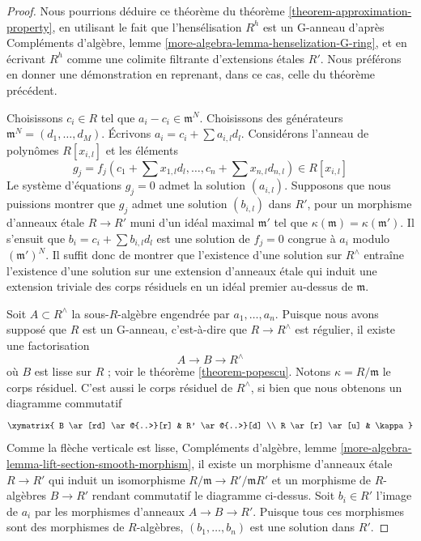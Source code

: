 \begin{proof}
Nous pourrions déduire ce théorème du théorème
\ref{theorem-approximation-property}, en utilisant le fait que
l'hensélisation $R^h$ est un G-anneau d'après
Compléments d'algèbre, lemme
\ref{more-algebra-lemma-henselization-G-ring}, et en écrivant $R^h$ comme une
colimite filtrante d'extensions \'etales $R'$. Nous préférons en donner une
démonstration en reprenant, dans ce cas, celle du théorème précédent.

\medskip\noindent
Choisissons $c_i \in R$ tel que $a_i - c_i \in \mathfrak m^N$.
Choisissons des générateurs $\mathfrak m^N = (d_1, \ldots, d_M)$.
Écrivons $a_i = c_i + \sum a_{i, l} d_l$.
Considérons l'anneau de polynômes $R[x_{i, l}]$ et les éléments
$$
g_j = f_j(c_1 + \sum x_{1, l} d_l , \ldots, c_n + \sum x_{n, l} d_{n, l})
\in R[x_{i, l}]
$$
Le système d'équations $g_j = 0$ admet la solution $(a_{i, l})$.
Supposons que nous puissions montrer que $g_j$ admet une solution
$(b_{i, l})$ dans $R'$, pour un morphisme d'anneaux \'etale $R \to R'$ muni
d'un idéal maximal $\mathfrak m'$ tel que
$\kappa(\mathfrak m) = \kappa(\mathfrak m')$.
Il s'ensuit que $b_i = c_i + \sum b_{i, l}d_l$ est une solution
de $f_j = 0$ congrue à $a_i$ modulo $(\mathfrak m')^N$.
Il suffit donc de montrer que l'existence d'une solution sur $R^\wedge$
entraîne l'existence d'une solution sur une extension d'anneaux \'etale
qui induit une extension triviale des corps résiduels en un idéal premier
au-dessus de $\mathfrak m$.

\medskip\noindent
Soit $A \subset R^\wedge$ la sous-$R$-algèbre engendrée par
$a_1, \ldots, a_n$. Puisque nous avons supposé que $R$ est un G-anneau,
c'est-à-dire que $R \to R^\wedge$ est régulier, il existe une factorisation
$$
A \to B \to R^\wedge
$$
où $B$ est lisse sur $R$ ; voir le théorème \ref{theorem-popescu}.
Notons $\kappa = R/\mathfrak m$ le corps résiduel. C'est aussi
le corps résiduel de $R^\wedge$, si bien que nous obtenons un diagramme
commutatif
$$
\xymatrix{
B \ar[rd] \ar@{..>}[r] & R' \ar@{..>}[d] \\
R \ar[r] \ar[u] & \kappa
}
$$
Comme la flèche verticale est lisse,
Compléments d'algèbre, lemme
\ref{more-algebra-lemma-lift-section-smooth-morphism},
il existe un morphisme d'anneaux \'etale $R \to R'$ qui induit un isomorphisme
$R/\mathfrak m \to R'/\mathfrak mR'$ et un morphisme de $R$-algèbres
$B \to R'$ rendant commutatif le diagramme ci-dessus.
Soit $b_i \in R'$ l'image de $a_i$ par les morphismes d'anneaux
$A \to B \to R'$. Puisque tous ces morphismes sont des morphismes de
$R$-algèbres, $(b_1, \ldots, b_n)$ est une solution dans $R'$.
\end{proof}

